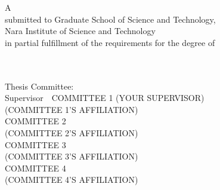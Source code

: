 
\thispagestyle{empty}
\begin{center}
	\null\vskip 73mm
	A {\@thesistype} \\
	submitted to Graduate School of Science and Technology, \\
    Nara Institute of Science and Technology \\
    in partial fulfillment of the requirements for the degree of \\
    {\@degree} \\
    \vskip 7mm
    {\@author} \\
\end{center}
\vskip 10mm
\leftskip 12.7mm
Thesis Committee: \\
Supervisor~~COMMITTEE 1 (YOUR SUPERVISOR) \\
\hspace{2cm} (COMMITTEE 1'S AFFILIATION) \\
COMMITTEE 2 \\
(COMMITTEE 2'S AFFILIATION) \\
COMMITTEE 3 \\
(COMMITTEE 3'S AFFILIATION) \\
COMMITTEE 4 \\
(COMMITTEE 4'S AFFILIATION)\\